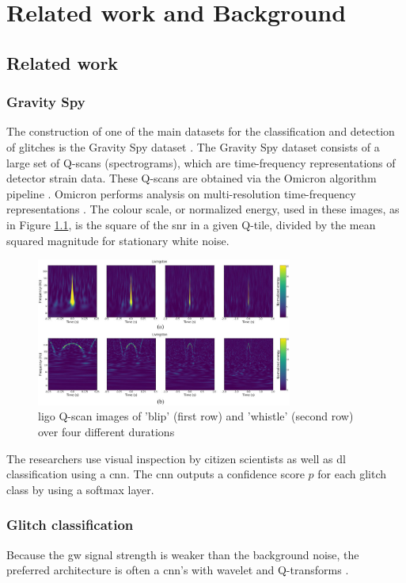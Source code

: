 \chapter{Related work and Background}
\label{ch-2}
\section{Related work}
\subsection{Gravity Spy}
The construction of one of the main datasets for the classification and detection of glitches is the Gravity Spy dataset \citep{zevin2017gravity, glanzer2023data}. 
The Gravity Spy dataset consists of a large set of Q-scans (spectrograms), which are time-frequency representations of detector strain data. These Q-scans are obtained via the Omicron algorithm pipeline \citep{robinet2020omicron}. Omicron performs analysis on multi-resolution time-frequency representations \citep{chatterji2004multiresolution}. The colour scale, or normalized energy, used in these images, as in Figure \ref{fig:spectrogram_examples}, is the square of the \acrshort{snr} in a given Q-tile, divided by the mean squared magnitude for stationary white noise.
\begin{figure}[H]
    \centering
    \includegraphics[width=0.75\textwidth]{Images/omegascan_examples.jpg}
    \caption{\acrshort{ligo} Q-scan images of 'blip' (first row) and 'whistle' (second row) over four different durations \citep{zevin2017gravity}}
    \label{fig:spectrogram_examples}
\end{figure}
The researchers use visual inspection by citizen scientists as well as \acrshort{dl} classification using a \acrshort{cnn}. The \acrshort{cnn} outputs a confidence score $p$ for each glitch class by using a softmax layer. \\

\subsection{Glitch classification}
Because the \acrshort{gw} signal strength is weaker than the background noise, the preferred architecture is often a \acrshort{cnn}'s with wavelet and Q-transforms \citep{cuoco2020enhancing}. 

